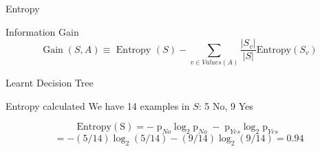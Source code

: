 \documentclass{beamer}
\begin{document}

\begin{frame}{Entropy}
\end{frame}
	
	
\begin{frame}{Information Gain}
$$
\operatorname{Gain}(S, A) \equiv \text { Entropy }(S)-\sum_{v \in V a l u e s(A)} \frac{\left|S_{v}\right|}{|S|} \text {Entropy}\left(S_{v}\right)
$$
\end{frame}
\begin{frame}{Learnt Decision Tree}

\end{frame}


\begin{frame}{Entropy calculated}
We have 14 examples in $S$: 5 No, 9 Yes

$$\operatorname{Entropy(S)} = -\operatorname{p}_{No}\operatorname{log_2}{\operatorname{p}_{No}}
-\operatorname{p}_{Yes}\operatorname{log_2}{\operatorname{p}_{Yes}}$$
$$
=-(5 / 14) \log _{2}(5 / 14)-(9 / 14) \log _{2}(9 / 14) =0.94
$$
\end{frame}
\end{document}
